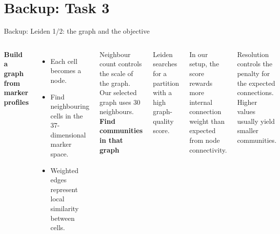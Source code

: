 \documentclass[aspectratio=169,10pt]{beamer}
\newcommand{\slidelabel}{SSBI}
\begin{document}
\renewcommand{\slidelabel}{SSBI · Task 3 · Backup}
\section{Backup: Task 3}
\begin{frame}{Backup: Leiden 1/2: the graph and the objective}
  \begin{columns}[T,onlytextwidth]
    \textbf{Build a graph from marker profiles}
    \begin{itemize}
      \item Each cell becomes a node.
      \item Find neighbouring cells in the 37-dimensional marker space.
      \item Weighted edges represent local similarity between cells.
    \end{itemize}
    \small Neighbour count controls the scale of the graph. Our selected graph uses 30 neighbours.
    \textbf{Find communities in that graph}\par
    Leiden searches for a partition with a high graph-quality score. \par\vspace{3mm}
    In our setup, the score rewards more internal connection weight than expected from node connectivity.\par\vspace{3mm}
    \small Resolution controls the penalty for the expected connections. Higher values usually yield smaller communities.
  \end{columns}
\end{frame}
\end{document}
